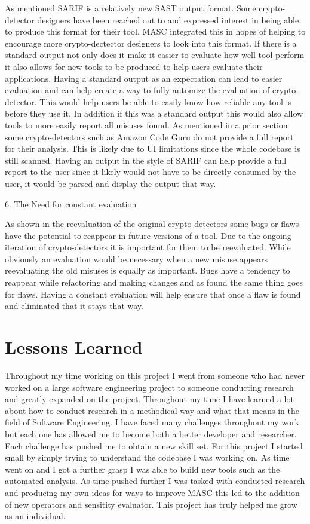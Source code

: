 As mentioned SARIF is a relatively new SAST output format. Some crypto-detector designers have been reached out to and expressed interest in being able to produce this format for their tool. MASC integrated this in hopes of helping to encourage more crypto-dectector designers to look into this format. If there is a standard output not only does it make it easier to evaluate how well tool perform it also allows for new tools to be produced to help users evaluate their applications. Having a standard output as an expectation can lead to easier evaluation and can help create a way to fully automize the evaluation of crypto-detector. This would help users be able to easily know how reliable any tool is before they use it. In addition if this was a standard output this would also allow tools to more easily report all misuses found. As mentioned in a prior section some crypto-detectors such as Amazon Code Guru do not provide a full report for their analysis. This is likely due to UI limitations since the whole codebase is still scanned. Having an output in the style of SARIF can help provide a full report to the user since it likely would not have to be directly consumed by the user, it would be parsed and display the output that way. 

6. The Need for constant evaluation

As shown in the reevaluation of the original crypto-detectors some bugs or flaws have the potential to reappear in future versions of a tool. Due to the ongoing iteration of crypto-detectors it is important for them to be reevaluated. While obviously an evaluation would be necessary when a new misuse appears reevaluating the old misuses is equally as important. Bugs have a tendency to reappear while refactoring and making changes and as found the same thing goes for flaws. Having a constant evaluation will help ensure that once a flaw is found and eliminated that it stays that way.


\section{Lessons Learned}
\label{ch6:sec:lessons}

Throughout my time working on this project I went from someone who had never worked on a large software engineering project to someone conducting research and greatly expanded on the project. Throughout my time I have learned a lot about how to conduct research in a methodical way and what that means in the field of Software Engineering. I have faced many challenges throughout my work but each one has allowed me to become both a better developer and researcher. Each challenge has pushed me to obtain a new skill set. For this project I started small by simply trying to understand the codebase I was working on. As time went on and I got a further grasp I was able to build new tools such as the automated analysis. As time pushed further I was tasked with conducted research and producing my own ideas for ways to improve MASC this led to the addition of new operators and sensitity evaluator. This project has truly helped me grow as an individual.


